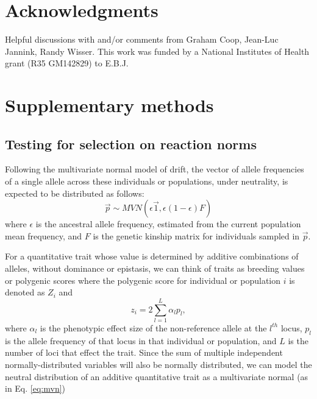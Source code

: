 \documentclass[11pt,letterpaper]{article}
\newcommand{\beginsupplement}{%
        \setcounter{table}{0}
        \renewcommand{\thetable}{S\arabic{table}}%
        \setcounter{figure}{0}
        \renewcommand{\thefigure}{S\arabic{figure}}%
}
\begin{document}
\section*{Acknowledgments}
Helpful discussions with and/or comments from Graham Coop, Jean-Luc Jannink, Randy Wisser. This work was funded by a National Institutes of Health grant (R35 GM142829) to E.B.J.




\beginsupplement

\section*{Supplementary methods}

\subsection*{Testing for selection on reaction norms}
Following the multivariate normal model of drift, the vector of allele frequencies of a single allele across these individuals or populations, under neutrality, is expected to be distributed as follows:
\begin{equation}\label{eq:mvna}
\vec{p} \sim MVN (\epsilon \vec{1}, \epsilon (1-\epsilon) F)
\end{equation}
where $\epsilon$ is the ancestral allele frequency, estimated from the current population mean frequency, and $F$ is the genetic kinship matrix for individuals sampled in $\vec{p}$.

For a quantitative trait whose value is determined by additive combinations of alleles, without dominance or epistasis, we can think of traits as breeding values or polygenic scores where the polygenic score for individual or population $i$ is denoted as $Z_{i}$ and
\begin{equation}\label{eq:pgs}
  z_{i} = 2\sum_{l=1}^{L}\alpha_{l}p_{l},
\end{equation}
where $\alpha_{l}$ is the phenotypic effect size of the non-reference allele at the $l^{th}$ locus, $p_{l}$ is the allele frequency of that locus in that individual or population, and $L$ is the number of loci that effect the trait.
Since the sum of multiple independent normally-distributed variables will also be normally distributed, we can model the neutral distribution of an additive quantitative trait as a multivariate normal (as in Eq. \ref{eq:mvn})
\end{document}
